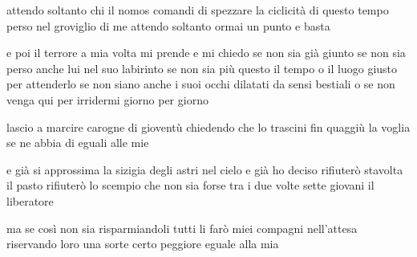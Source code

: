 \begin{poem}
	\begin{stanza}
		attendo soltanto\verseline
		chi il nomos comandi di spezzare\verseline
		la ciclicità di questo tempo\verseline
		perso nel groviglio di me\verseline
		attendo soltanto ormai\verseline
		un punto e basta
	\end{stanza}

	\begin{stanza}
		e poi il terrore a mia volta\verseline
		mi prende e mi chiedo\verseline
		se non sia già giunto\verseline
		se non sia perso anche lui\verseline
		nel suo labirinto\verseline
		se non sia più questo il tempo\verseline
		o il luogo giusto per attenderlo\verseline
		se non siano anche i suoi occhi\verseline
		dilatati da sensi bestiali\verseline
		o se non venga qui per irridermi\verseline
		giorno per giorno
	\end{stanza}

	\begin{stanza}
		lascio a marcire\verseline
		carogne di gioventù\verseline
		chiedendo che lo trascini\verseline
		fin quaggiù la voglia\verseline
		se ne abbia di eguali alle mie
	\end{stanza}

	\begin{stanza}
		e già si approssima la sizigia\verseline
		degli astri nel cielo\verseline
		e già ho deciso\verseline
		rifiuterò stavolta il pasto\verseline
		rifiuterò lo scempio\verseline
		che non sia forse\verseline
		tra i due volte sette giovani\verseline
		il liberatore
	\end{stanza}

	\begin{stanza}
		ma se così non sia\verseline
		risparmiandoli tutti\verseline
		li farò miei compagni nell’attesa\verseline
		riservando loro una sorte\verseline
		certo peggiore\verseline
		eguale alla mia
	\end{stanza}
\end{poem}

\clearpage


